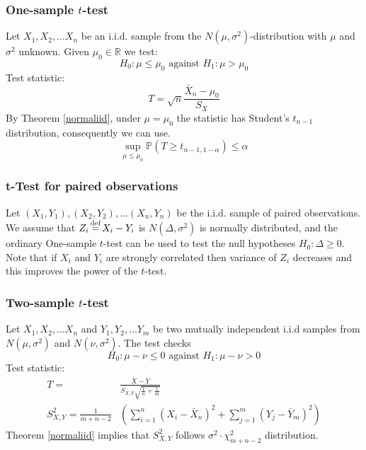 \documentclass[12pt]{article}
\theoremstyle{definition}
\theoremstyle{remark}
\numberwithin{equation}{section}
\newcommand{\RR}{\mathbb{R}}
\newcommand{\PP}{\mathbb{P}}
\newcommand{\eq}{\stackrel{\mathclap{\normalfont\text{def}}}{=}}
\begin{document}
\subsubsection{One-sample $t$-test}
Let $X_1, X_2,\ldots X_n$ be an i.i.d. sample from the $N(\mu, \sigma^2)$-distribution with $\mu$ and $\sigma^2$ unknown. Given $\mu_0\in\RR$ we test:
\begin{equation}\label{ttest}
	H_0:\mu\leq \mu_0 \text{ against } H_1: \mu>\mu_0
\end{equation}
Test statistic:
\begin{equation}\label{tstatistic}
	T = \sqrt{n}\frac{\bar X_n - \mu_0}{S_X}
\end{equation}
By Theorem \ref{normaliid}, under $\mu = \mu_0$ the statistic has Student's $t_{n-1}$ distribution, consequently we can use.
\begin{equation}
	\sup_{\mu\leq\mu_0}\PP \left(T \geq t_{n-1, 1-\alpha}\right) \leq \alpha
\end{equation}

\subsubsection{t-Test for paired observations}
Let $(X_1, Y_1), (X_2, Y_2),\ldots (X_n, Y_n)$ be the i.i.d. sample of paired observations. We assume that $Z_i \eq X_i - Y_i$ is $N(\Delta, \sigma^2)$ is normally distributed, and the ordinary One-sample $t$-test can be used to test the null hypotheses $H_0:\Delta\geq0$. Note that if $X_i$ and $Y_i$ are strongly correlated then variance of $Z_i$ decreases and this improves the power of the $t$-test.

\subsubsection{Two-sample $t$-test}
Let $X_1, X_2,\ldots X_n$ and $Y_1, Y_2,\ldots Y_m$ be two mutually independent i.i.d samples from $N(\mu, \sigma^2)$ and $N(\nu, \sigma^2)$. The test checks
\begin{equation}
	H_0:\mu-\nu \leq 0 \text{ against } H_1: \mu-\nu>0
\end{equation}
Test statistic:
\begin{align}
	T =& \frac{\bar{X} - \bar{Y}}{S_{X,Y}\sqrt{\frac1n+\frac1m}}\\
	S_{X,Y}^2 = \frac1{m+n-2}&\left(\sum_{i=1}^n (X_i - \bar X_n)^2+ \sum_{j=1}^m (Y_j - \bar Y_m)^2\right)
\end{align}
Theorem \ref{normaliid} implies that $S_{X,Y}^2$ follows $\sigma^2 \cdot \chi^2_{m+n-2}$ distribution.
\end{document}
